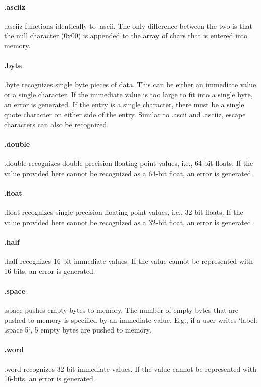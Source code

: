 \documentclass[
    paper=letter,
    parskip=half,
    fontsize=12pt,
    titlepage=firstiscover,
    toc=bibliography,
    numbers=endperiod
]{scrartcl}
\begin{document}
\paragraph{.asciiz}
.asciiz functions identically to .ascii.
The only difference between the two is that the null character (0x00) is appended to the array of chars that is entered into memory.

\paragraph{.byte}
.byte recognizes single byte pieces of data.
This can be either an immediate value or a single character.
If the immediate value is too large to fit into a single byte, an error is generated.
If the entry is a single character, there must be a single quote character on either side of the entry.
Similar to .ascii and .asciiz, escape characters can also be recognized.

\paragraph{.double}
.double recognizes double-precision floating point values, i.e., 64-bit floats.
If the value provided here cannot be recognized as a 64-bit float, an error is generated.

\paragraph{.float}
.float recognizes single-precision floating point values, i.e., 32-bit floats.
If the value provided here cannot be recognized as a 32-bit float, an error is generated.

\paragraph{.half}
.half recognizes 16-bit immediate values.
If the value cannot be represented with 16-bits, an error is generated.

\paragraph{.space}
.space pushes empty bytes to memory.
The number of empty bytes that are pushed to memory is specified by an immediate value.
E.g., if a user writes `label: .space 5`, 5 empty bytes are pushed to memory.

\paragraph{.word}
.word recognizes 32-bit immediate values.
If the value cannot be represented with 16-bits, an error is generated.
\end{document}
